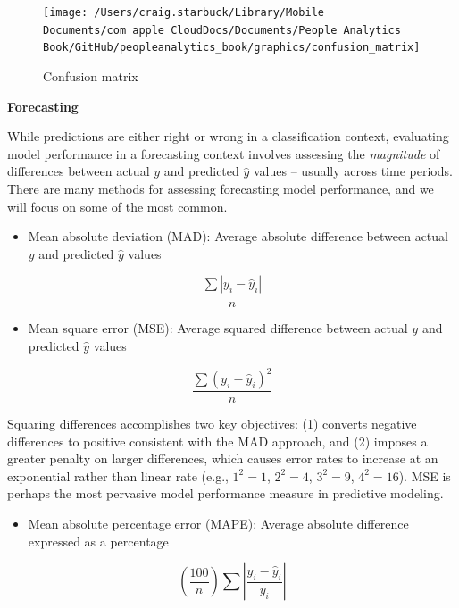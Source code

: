 \documentclass[
]{book}
\providecommand{\tightlist}{%
  \setlength{\itemsep}{0pt}\setlength{\parskip}{0pt}}
\begin{document}
\begin{figure}

{\centering \texttt{[image: /Users/craig.starbuck/Library/Mobile Documents/com~apple~CloudDocs/Documents/People Analytics Book/GitHub/peopleanalytics\_book/graphics/confusion\_matrix]} 

}

\caption{Confusion matrix}\label{fig:confusion-mtx}
\end{figure}

\textbf{Forecasting}

While predictions are either right or wrong in a classification context, evaluating model performance in a forecasting context involves assessing the \emph{magnitude} of differences between actual \(y\) and predicted \(\hat y\) values -- usually across time periods. There are many methods for assessing forecasting model performance, and we will focus on some of the most common.

\begin{itemize}
\tightlist
\item
  Mean absolute deviation (MAD): Average absolute difference between actual \(y\) and predicted \(\hat y\) values
\end{itemize}

\[ \frac{\sum|y_i - \hat y_i|}{n} \]

\begin{itemize}
\tightlist
\item
  Mean square error (MSE): Average squared difference between actual \(y\) and predicted \(\hat y\) values
\end{itemize}

\[ \frac{\sum(y_i - \hat y_i)^2}{n} \]

Squaring differences accomplishes two key objectives: (1) converts negative differences to positive consistent with the MAD approach, and (2) imposes a greater penalty on larger differences, which causes error rates to increase at an exponential rather than linear rate (e.g., \(1^2 = 1\), \(2^2 = 4\), \(3^2 = 9\), \(4^2 = 16\)). MSE is perhaps the most pervasive model performance measure in predictive modeling.

\begin{itemize}
\tightlist
\item
  Mean absolute percentage error (MAPE): Average absolute difference expressed as a percentage
\end{itemize}

\[ (\frac{100}{n})\sum|\frac{y_i - \hat y_i}{y_i}| \]
\end{document}
